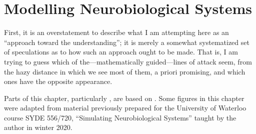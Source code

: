 
\chapter{Modelling Neurobiological Systems}
\label{chp:modelling_neurobiological_systems}

\begin{OpeningQuote}
First, it is an overstatement to describe what I am attempting here as an \enquote{approach toward the understanding}; it is merely a somewhat systematized set of speculations as to how such an approach ought to be made. That is, I am trying to guess which of the---mathematically guided---lines of attack seem, from the hazy distance in which we see most of them, a priori promising, and which ones have the opposite appearance.
\end{OpeningQuote}

\begin{PriorPublication}
Parts of this chapter, particularly , are based on \citet{stoeckel2021}.
Some figures in this chapter were adapted from material previously prepared for the University of Waterloo course SYDE 556/720, \enquote{Simulating Neurobiological Systems} taught by the author in winter 2020.
\end{PriorPublication}



\clearpage
\setcounter{section}{0}


\clearpage
\setcounter{section}{1}


\clearpage
\setcounter{section}{2}

